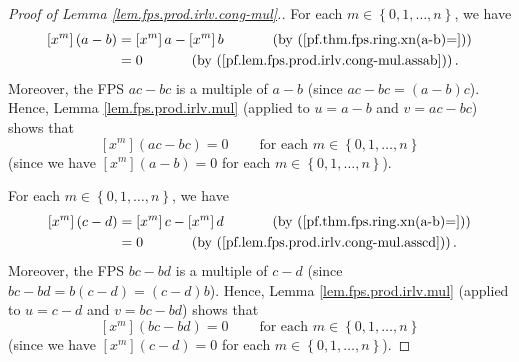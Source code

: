 \begin{proof}
[Proof of Lemma \ref{lem.fps.prod.irlv.cong-mul}.]For each $m\in\left\{
0,1,\ldots,n\right\}  $, we have%
\begin{align*}
\left[  x^{m}\right]  \left(  a-b\right)   &  =\left[  x^{m}\right]  a-\left[
x^{m}\right]  b\ \ \ \ \ \ \ \ \ \ \left(  \text{by
(\ref{pf.thm.fps.ring.xn(a-b)=})}\right) \\
&  =0\ \ \ \ \ \ \ \ \ \ \left(  \text{by
(\ref{pf.lem.fps.prod.irlv.cong-mul.assab})}\right)  .
\end{align*}
Moreover, the FPS $ac-bc$ is a multiple of $a-b$ (since $ac-bc=\left(
a-b\right)  c$). Hence, Lemma \ref{lem.fps.prod.irlv.mul} (applied to $u=a-b$
and $v=ac-bc$) shows that
\begin{equation}
\left[  x^{m}\right]  \left(  ac-bc\right)  =0\ \ \ \ \ \ \ \ \ \ \text{for
each }m\in\left\{  0,1,\ldots,n\right\}
\label{pf.lem.fps.prod.irlv.cong-mul.2}%
\end{equation}
(since we have $\left[  x^{m}\right]  \left(  a-b\right)  =0$ for each
$m\in\left\{  0,1,\ldots,n\right\}  $).

For each $m\in\left\{  0,1,\ldots,n\right\}  $, we have%
\begin{align*}
\left[  x^{m}\right]  \left(  c-d\right)   &  =\left[  x^{m}\right]  c-\left[
x^{m}\right]  d\ \ \ \ \ \ \ \ \ \ \left(  \text{by
(\ref{pf.thm.fps.ring.xn(a-b)=})}\right) \\
&  =0\ \ \ \ \ \ \ \ \ \ \left(  \text{by
(\ref{pf.lem.fps.prod.irlv.cong-mul.asscd})}\right)  .
\end{align*}
Moreover, the FPS $bc-bd$ is a multiple of $c-d$ (since $bc-bd=b\left(
c-d\right)  =\left(  c-d\right)  b$). Hence, Lemma \ref{lem.fps.prod.irlv.mul}
(applied to $u=c-d$ and $v=bc-bd$) shows that
\begin{equation}
\left[  x^{m}\right]  \left(  bc-bd\right)  =0\ \ \ \ \ \ \ \ \ \ \text{for
each }m\in\left\{  0,1,\ldots,n\right\}
\label{pf.lem.fps.prod.irlv.cong-mul.4}%
\end{equation}
(since we have $\left[  x^{m}\right]  \left(  c-d\right)  =0$ for each
$m\in\left\{  0,1,\ldots,n\right\}  $).


\end{proof}
